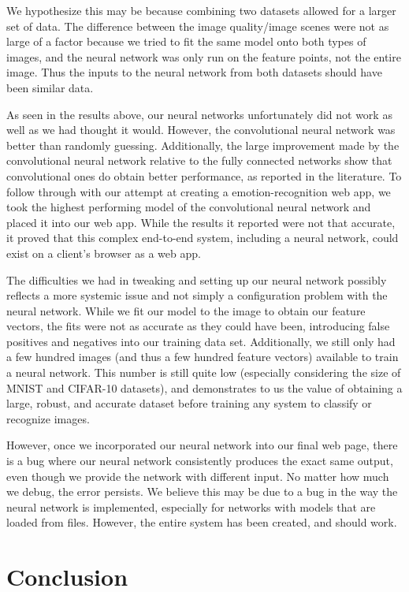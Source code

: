 \documentclass[10pt,twocolumn,letterpaper]{article}
\begin{document}
We hypothesize this may be because combining two datasets allowed for a larger set of data. The difference between the image quality/image scenes were not as large of a factor because we tried to fit the same model onto both types of images, and the neural network was only run on the feature points, not the entire image. Thus the inputs to the neural network from both datasets should have been similar data.

As seen in the results above, our neural networks unfortunately did not work as well as we had thought it would. However, the convolutional neural network was better than randomly guessing. Additionally, the large improvement made by the convolutional neural network relative to the fully connected networks show that convolutional ones do obtain better performance, as reported in the literature. To follow through with our attempt at creating a emotion-recognition web app, we took the highest performing model of the convolutional neural network and placed it into our web app. While the results it reported were not that accurate, it proved that this complex end-to-end system, including a neural network, could exist on a client's browser as a web app.

The difficulties we had in tweaking and setting up our neural network possibly reflects a more systemic issue and not simply a configuration problem with the neural network. While we fit our model to the image to obtain our feature vectors, the fits were not as accurate as they could have been, introducing false positives and negatives into our training data set. Additionally, we still only had a few hundred images (and thus a few hundred feature vectors) available to train a neural network. This number is still quite low (especially considering the size of MNIST and CIFAR-10 datasets), and demonstrates to us the value of obtaining a large, robust, and accurate dataset before training any system to classify or recognize images.

However, once we incorporated our neural network into our final web page, there is a bug where our neural network consistently produces the exact same output, even though we provide the network with different input. No matter how much we debug, the error persists. We believe this may be due to a bug in the way the neural network is implemented, especially for networks with models that are loaded from files. However, the entire system has been created, and should work.

\section{Conclusion}
\end{document}
